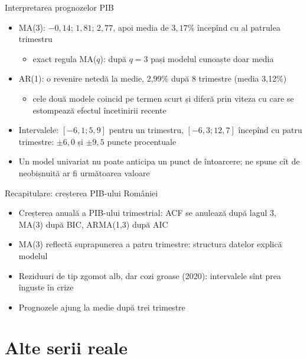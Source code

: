 \begin{frame}{Interpretarea prognozelor PIB}
\itemsize{\small}
\begin{itemize}
    \item MA(3): $\ensuremath{-}0{,}14$; $1{,}81$; $2{,}77$, apoi media de $3{,}17\%$ începînd cu al patrulea trimestru
    \begin{itemize}
        \item exact regula MA($q$): după $q = 3$ pași modelul cunoaște doar media
    \end{itemize}
    \item AR(1): o revenire netedă la medie, 2{,}99\% după 8 trimestre (media 3{,}12\%)
    \begin{itemize}
        \item cele două modele coincid pe termen scurt și diferă prin viteza cu care se estompează efectul încetinirii recente
    \end{itemize}
    \item Intervalele: $[\ensuremath{-}6{,}1; 5{,}9]$ pentru un trimestru, $[\ensuremath{-}6{,}3; 12{,}7]$ începînd cu patru trimestre: $\pm 6{,}0$ și $\pm 9{,}5$ puncte procentuale
    \item Un model univariat nu poate anticipa un punct de întoarcere; ne spune cît de neobișnuită ar fi următoarea valoare
\end{itemize}
\end{frame}

\begin{frame}{Recapitulare: creșterea PIB-ului României}
\itemsize{\small}
\begin{itemize}
    \item Creșterea anuală a PIB-ului trimestrial: ACF se anulează după lagul 3, MA(3) după BIC, ARMA(1,3) după AIC
    \item MA(3) reflectă suprapunerea a patru trimestre: structura datelor explică modelul
    \item Reziduuri de tip zgomot alb, dar cozi groase (2020): intervalele sînt prea înguste în crize
    \item Prognozele ajung la medie după trei trimestre
\end{itemize}
\end{frame}


\section{Alte serii reale}

